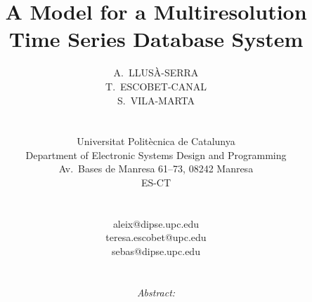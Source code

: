 \documentclass[twocolumn,11pt,a4paper]{article}
\begin{document}
\global\def\refname{{\normalsize \it References:}}
%
\baselineskip 12.5pt
%
%
%
\title{\LARGE \bf A Model for a Multiresolution Time Series Database
  System}

\date{}

\author{\hspace*{-10pt}
  \begin{minipage}[t]{2.3in} \normalsize \baselineskip 12.5pt
    \centerline{\scshape A.~LLUSÀ-SERRA}
  \end{minipage} \kern 0in
  \begin{minipage}[t]{2.3in} \normalsize \baselineskip 12.5pt
    \centerline{\scshape T.~ESCOBET-CANAL}
  \end{minipage} \kern 0in
  \begin{minipage}[t]{2.3in} \normalsize \baselineskip 12.5pt
    \centerline{\scshape S.~VILA-MARTA}
  \end{minipage} \\ \hspace*{-10pt}
  \begin{minipage}[t]{2.7in} \normalsize \baselineskip 12.5pt
    \centerline{Universitat Politècnica de Catalunya}
    \centerline{Department of Electronic Systems Design and Programming}
    \centerline{Av.~Bases de Manresa 61--73, 08242 Manresa}
    \centerline{\scshape ES-CT}
  \end{minipage} \\ \hspace*{-5pt}
  \begin{minipage}[t]{2.3in} \normalsize \baselineskip 12.5pt
    \centerline{aleix@dipse.upc.edu}
  \end{minipage} \kern 0in
  \begin{minipage}[t]{2.3in} \normalsize \baselineskip 12.5pt
    \centerline{teresa.escobet@upc.edu}
  \end{minipage} \kern 0in
  \begin{minipage}[t]{2.3in} \normalsize \baselineskip 12.5pt
    \centerline{sebas@dipse.upc.edu}
  \end{minipage} 
  \\[5pt]
  \begin{minipage}[b]{6.9in} \normalsize
    \baselineskip 12.5pt {\it Abstract:}

\end{minipage}}
\end{document}
